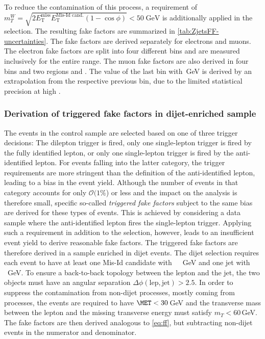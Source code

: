 To reduce the contamination of this process, a requirement of $m_T^W = \sqrt{2E^{\textrm{miss}}_\textrm{T} E^{\text{Mis-Id cand.}}_\textrm{T} (1-\cos\phi)} < 50\;\textrm{GeV}$ is additionally applied in the \Zjets selection.
The resulting fake factors are summarized in \cref{tab:ZjetsFF-uncertainties}.
The fake factors are derived separately for electrons and muons. The electron fake factors are split into four different \pT bins and are measured inclusively for the entire \abseta range. 
The muon fake factors are also derived in four \pT bins and two \abseta regions  and . The value of the last \pT bin with \,GeV is derived by an extrapolation from the respective previous bin, due to the limited statistical precision at high \pT.

\subsubsection{Derivation of triggered fake factors in dijet-enriched sample}
The events in the control sample are selected based on one of three trigger decisions: The dilepton trigger is fired, only one single-lepton trigger is fired by the fully identified lepton, or only one single-lepton trigger is fired by the anti-identified lepton. 
For events falling into the latter category, the trigger requirements are more stringent than the definition of the anti-identified lepton, leading to a bias in the event yield. 
Although the number of events in that category accounts for only $\mathcal{O}(1\%$) or less and the impact on the analysis is therefore small, specific so-called \emph{triggered fake factors} subject to the same bias are derived for these types of events. This is achieved by considering a data sample where the anti-identified lepton fires the single-lepton trigger. 
Applying such a requirement in addition to the \Zjets selection, however, leads to an insufficient event yield to derive reasonable fake factors. The triggered fake factors are therefore derived in a sample enriched in dijet events.
The dijet selection requires each event to have at least one Mis-Id candidate with ~\,~GeV and one jet with ~\,~GeV. To ensure a back-to-back topology between the lepton and the jet, the two objects must have an angular separation $\Delta \phi(\text{lep}, \text{jet}) > 2.5$. 
In order to suppress the contamination from non-dijet processes, mostly coming from \Wjets processes, the events are required to have $\MET < 30$\,GeV and the transverse mass between the lepton and the missing transverse energy must satisfy $m_T < 60\,$GeV. 
The fake factors are then derived analogous to \cref{eq:ff}, but subtracting non-dijet events in the numerator and denominator. 


